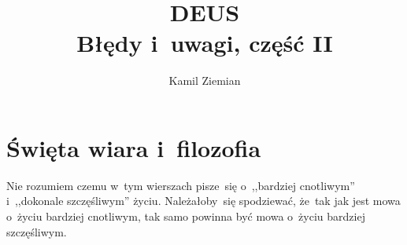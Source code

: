 \documentclass[a4paper,11pt]{article}
\title{DEUS \\
  {\Large Błędy i~uwagi, część II}}
\author{Kamil Ziemian}
\begin{document}





\maketitle  %





\section{Święta wiara i~filozofia}

\vspace{\spaceTwo}







{}

\vspace{0em}



\vspace{0em}


 Nie rozumiem czemu w~tym wierszach pisze~się o~,,bardziej
cnotliwym'' i~,,dokonale szczęśliwym'' życiu. Należałoby~się spodziewać, że~tak
jak jest mowa o~życiu bardziej cnotliwym, tak samo powinna być mowa o~życiu
bardziej szczęśliwym.

\vspace{\spaceFour}
\end{document}
